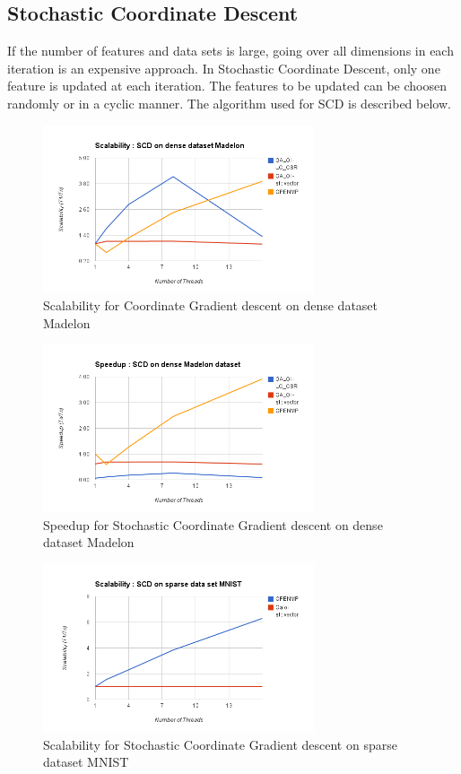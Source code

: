\documentclass{sigplanconf}
\begin{document}
\subsection{Stochastic Coordinate Descent}
If the number of features and data sets is large, going over all dimensions in each iteration is an
expensive approach. In Stochastic Coordinate Descent, only one feature is updated at each iteration. The 
features to be updated can be choosen randomly or in a cyclic manner. The algorithm used for SCD is 
described below.

\begin{figure}[ht!]
\centering
\includegraphics[width=80mm]{scd_scale_dense.png}
\caption{Scalability for Coordinate Gradient descent on dense dataset Madelon }
\label{overflow}
\end{figure}

\begin{figure}[ht!]
\centering
\includegraphics[width=80mm]{scd_speed_dense.png}
\caption{Speedup for Stochastic Coordinate Gradient descent on dense dataset Madelon }
\label{overflow}
\end{figure}

\begin{figure}[ht!]
\centering
\includegraphics[width=80mm]{scd_scale_sparse.png}
\caption{Scalability for Stochastic Coordinate Gradient descent on sparse dataset MNIST }
\label{overflow}
\end{figure}
\end{document}
